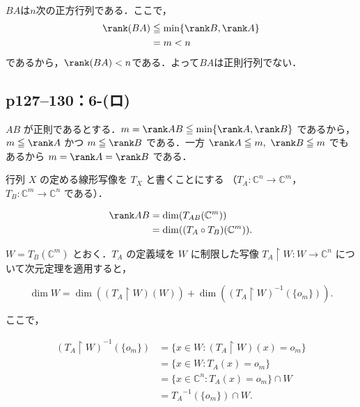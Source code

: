 \begin{tproof}
  $BA$は$n$次の正方行列である．ここで，
  \begin{align*}
    \rank (BA) & \leqq \min \{ \rank B, \rank A \} \\
               & =  m <n
  \end{align*}
  であるから，$\rank (BA)<n$である．よって$BA$は正則行列でない．
\end{tproof}


\subsection*{p127--130：6-(ロ)}

\begin{tproof}
  $AB$ が正則であるとする．$m = \rank AB \leq \min\{\rank A,\rank B \}$ であるから，
  $m \leq \rank A$ かつ $m \leq \rank B$ である．一方 $\rank A \leq m,\ \rank B \leq m$ でもあるから
  $m = \rank A = \rank B$ である．

  行列 $X$ の定める線形写像を $T_X$ と書くことにする
  （$T_A \colon  \mathbb{C}^n \to \mathbb{C}^m$，$ T_B \colon  \mathbb{C}^m \to \mathbb{C}^n$ である）．

  \begin{align*}
    \rank AB & = \dim(T_{AB}(\mathbb{C}^m))           \\
             & = \dim((T_A \circ T_B)(\mathbb{C}^m)).
  \end{align*}

  $W = T_B(\mathbb{C}^m)$ とおく．$T_A$ の定義域を $W$ に制限した写像 $T_A \upharpoonright W : W \to \mathbb{C}^n$ について次元定理を適用すると，

  \[
    \dim W = \dim((T_A \upharpoonright W)(W)) + \dim((T_A \upharpoonright W)^{-1}(\{o_m\})).
  \]

  ここで，

  \begin{align*}
    (T_A \upharpoonright W)^{-1}(\{o_m\}) & = \{ x \in W : (T_A \upharpoonright W)(x) = o_m \} \\
                                          & = \{ x \in W : T_A(x) = o_m \}                     \\
                                          & = \{ x \in \mathbb{C}^n : T_A(x) = o_m \} \cap W   \\
                                          & = {T_A}^{-1}(\{o_m\}) \cap W.
  \end{align*}


\end{tproof}
